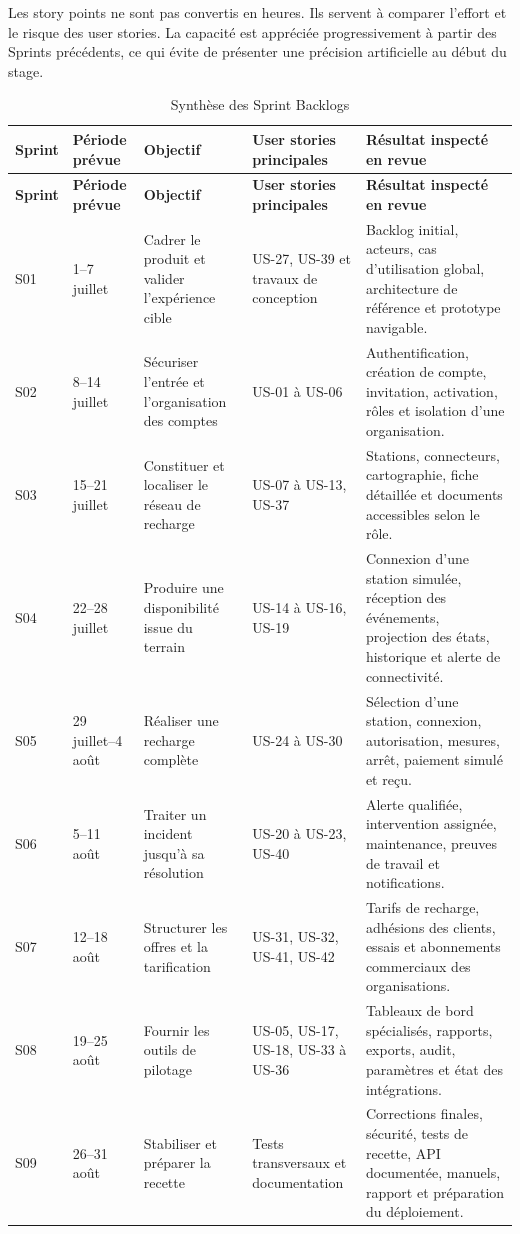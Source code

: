 Les story points ne sont pas convertis en heures. Ils servent à comparer l'effort et
le risque des user stories. La capacité est appréciée progressivement à partir des
Sprints précédents, ce qui évite de présenter une précision artificielle au début du
stage.

\begingroup
\small
\setlength{\tabcolsep}{2.5pt}
\begin{longtable}{|C{1.4cm}|C{2.25cm}|C{2.6cm}|p{3.3cm}|p{4.4cm}|}
  \caption{Synthèse des Sprint Backlogs}
  \label{tab:sprint-backlogs}\\
  \hline
  \textbf{Sprint} & \textbf{Période prévue} & \textbf{Objectif} &
  \textbf{User stories principales} & \textbf{Résultat inspecté en revue}\\
  \hline
  \endfirsthead
  \hline
  \textbf{Sprint} & \textbf{Période prévue} & \textbf{Objectif} &
  \textbf{User stories principales} & \textbf{Résultat inspecté en revue}\\
  \hline
  \endhead
  S01 & 1--7 juillet &
  Cadrer le produit et valider l'expérience cible &
  US-27, US-39 et travaux de conception &
  Backlog initial, acteurs, cas d'utilisation global, architecture de référence et
  prototype navigable.\\\hline
  S02 & 8--14 juillet &
  Sécuriser l'entrée et l'organisation des comptes &
  US-01 à US-06 &
  Authentification, création de compte, invitation, activation, rôles et isolation
  d'une organisation.\\\hline
  S03 & 15--21 juillet &
  Constituer et localiser le réseau de recharge &
  US-07 à US-13, US-37 &
  Stations, connecteurs, cartographie, fiche détaillée et documents accessibles selon
  le rôle.\\\hline
  S04 & 22--28 juillet &
  Produire une disponibilité issue du terrain &
  US-14 à US-16, US-19 &
  Connexion d'une station simulée, réception des événements, projection des états,
  historique et alerte de connectivité.\\\hline
  S05 & 29 juillet--4 août &
  Réaliser une recharge complète &
  US-24 à US-30 &
  Sélection d'une station, connexion, autorisation, mesures, arrêt, paiement simulé
  et reçu.\\\hline
  S06 & 5--11 août &
  Traiter un incident jusqu'à sa résolution &
  US-20 à US-23, US-40 &
  Alerte qualifiée, intervention assignée, maintenance, preuves de travail et
  notifications.\\\hline
  S07 & 12--18 août &
  Structurer les offres et la tarification &
  US-31, US-32, US-41, US-42 &
  Tarifs de recharge, adhésions des clients, essais et abonnements commerciaux des
  organisations.\\\hline
  S08 & 19--25 août &
  Fournir les outils de pilotage &
  US-05, US-17, US-18, US-33 à US-36 &
  Tableaux de bord spécialisés, rapports, exports, audit, paramètres et état des
  intégrations.\\\hline
  S09 & 26--31 août &
  Stabiliser et préparer la recette &
  Tests transversaux et documentation &
  Corrections finales, sécurité, tests de recette, API documentée, manuels, rapport
  et préparation du déploiement.\\
  \hline
\end{longtable}
\endgroup

